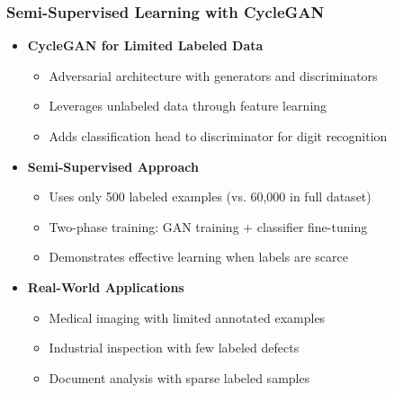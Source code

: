 \documentclass{beamer}
\begin{document}
\begin{frame}
\frametitle{Semi-Supervised Learning with CycleGAN}

\begin{itemize}
\item \textbf{CycleGAN for Limited Labeled Data}
    \begin{itemize}
        \item Adversarial architecture with generators and discriminators
        \item Leverages unlabeled data through feature learning
        \item Adds classification head to discriminator for digit recognition
    \end{itemize}
\item \textbf{Semi-Supervised Approach}
    \begin{itemize}
        \item Uses only 500 labeled examples (vs. 60,000 in full dataset)
        \item Two-phase training: GAN training + classifier fine-tuning
        \item Demonstrates effective learning when labels are scarce
    \end{itemize}
\item \textbf{Real-World Applications}
    \begin{itemize}
        \item Medical imaging with limited annotated examples
        \item Industrial inspection with few labeled defects
        \item Document analysis with sparse labeled samples
    \end{itemize}
\end{itemize}

\end{frame}
\end{document}
